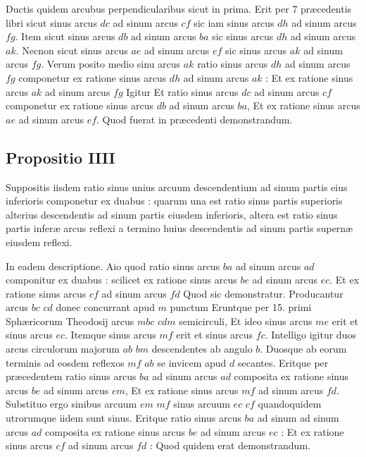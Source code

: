 \documentclass[11pt,a4paper]{article}
\begin{document}
Ductis quidem arcubus perpendicularibus sicut in prima. Erit per 7 præcedentis libri sicut sinus arcus $dc$ ad sinum arcus $cf$ sic iam sinus arcus $dh$ ad sinum arcus $fg$. Item sicut sinus arcus $db$ ad sinum arcus $ba$ sic sinus arcus $dh$ ad sinum arcus $ak$. Necnon sicut sinus arcus $ae$ ad sinum arcus $ef$ sic sinus arcus $ak$ ad sinum arcus $fg$. Verum posito medio sinu arcus $ak$ ratio sinus arcus $dh$ ad sinum arcus $fg$ componetur ex ratione sinus arcus $dh$ ad sinum arcus $ak$ : Et ex ratione sinus arcus $ak$ ad sinum arcus $fg$ Igitur Et ratio sinus arcus $dc$ ad sinum arcus $cf$ componetur ex ratione sinus arcus $db$ ad sinum arcus $ba$, Et ex ratione sinus arcus $ae$ ad sinum arcus $ef$. Quod fuerat in præcedenti demonstrandum.

\subsection*{Propositio IIII}

Suppositis iisdem ratio sinus unius arcuum descendentium ad sinum partis eius inferioris componetur ex duabus : quarum una est ratio sinus partis superioris alterius descendentis ad sinum partis eiusdem inferioris, altera est ratio sinus partis inferæ arcus reflexi a termino huius descendentis ad sinum partis supernæ eiusdem reflexi.

In eadem descriptione. Aio quod ratio sinus arcus $ba$ ad sinum arcus $ad$ componitur ex duabus : scilicet ex ratione sinus arcus $be$ ad sinum arcus $ec$. Et ex ratione sinus arcus $cf$ ad sinum arcus $fd$ Quod sic demonstratur. Producantur arcus $bc$ $cd$ donec concurrant apud $m$ punctum Eruntque per 15. primi Sphæricorum Theodosij arcus $mbc$ $cdm$ semicirculi, Et ideo sinus arcus $me$ erit et sinus arcus $ec$. Itemque sinus arcus $mf$ erit et sinus arcus $fc$. Intelligo igitur duos arcus circulorum majorum $ab$ $bm$ descendentes ab angulo $b$. Duosque ab eorum terminis ad eosdem reflexos $mf$ $ab$ se invicem apud $d$ secantes. Eritque per præcedentem ratio sinus arcus $ba$ ad sinum arcus $ad$ composita ex ratione sinus arcus $be$ ad sinum arcus $em$, Et ex ratione sinus arcus $mf$ ad sinum arcus $fd$. Substituo ergo sinibus arcuum $em$ $mf$ sinus arcuum $ec$ $cf$ quandoquidem utrorumque iidem sunt sinus. Eritque ratio sinus arcus $ba$ ad sinum ad sinum arcus $ad$ composita ex ratione sinus arcus $be$ ad sinum arcus $ec$ : Et ex ratione sinus arcus $cf$ ad sinum arcus $fd$ : Quod quidem erat demonstrandum.
\end{document}
